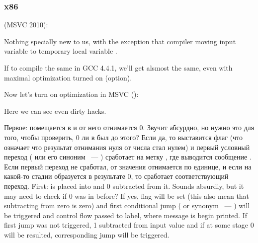 ﻿\subsubsection{x86}



 (MSVC 2010):



{Nothing specially new to us, with the exception that compiler moving input variable 
 to temporary local variable .}

{If to compile the same in GCC 4.4.1, we'll get alsmost the same, even with maximal optimization 
turned on (\Othree option).}

{Now let's turn on optimization in} MSVC (\Ox): 



{Here we can see even dirty hacks.}

\IFRU
{Первое:  помещается в \EAX и от него отнимается 0. Звучит абсурдно, но нужно это для того, чтобы проверить, 
0 ли в \EAX был до этого? Если да, то выставится флаг \ZF (что означает что результат отнимания нуля от числа 
стал нулем) и первый условный переход \JE ( или его синоним \JZ ~--- ) 
сработает на метку , где выводится сообщение .
Если первый переход не сработал, от значения отнимается по единице, 
и если на какой-то стадии образуется в результате 0, то сработает соответствующий переход.}
{First:  is placed into \EAX and 0 subtracted from it. Sounds absurdly, but it may need to check if 
0 was in \EAX before? If yes, flag \ZF will be set (this also mean that subtracting from zero is zero) 
and first conditional jump \JE ( or synonym \JZ ~--- ) will be triggered 
and control flow passed to  label, where  message is begin printed. 
If first jump was not triggered, 1 subtracted from input value and if at some stage 0 will be resulted, 
corresponding jump will be triggered.}

